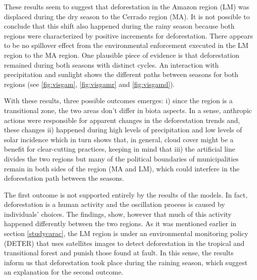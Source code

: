 

These results seem to suggest that deforestation in the Amazon region (LM) was displaced during the dry season to the Cerrado region (MA). It is not possible to conclude that this shift also happened during the rainy season because both regions were characterized by positive increments for deforestation. There appears to be no spillover effect from the environmental enforcement executed in the LM region to the MA region. One plausible piece of evidence is that deforestation remained during both seasons with distinct cycles. An interaction with precipitation and sunlight shows the different paths between seasons for both regions (see \ref{fig:visgam}, \ref{fig:visgamr} and \ref{fig:visgamd}). 

With these results, three possible outcomes emerges: i) since the region is a transitional zone, the two areas don't differ in biota aspects. In a sense, anthropic actions were responsible for apparent changes in the deforestation trends and, these changes ii) happened during high levels of precipitation and low levels of solar incidence which in turn shows that, in general, cloud cover might be a benefit for clear-cutting practices, keeping in mind that iii) the artificial line divides the two regions but many of the political boundaries of municipalities remain in both sides of the region (MA and LM), which could interfere in the deforestation path between the seasons.


The first outcome is not supported entirely by the results of the models. In fact, deforestation is a human activity and the oscillation process is caused by individuals' choices. The findings, show, however that much of this activity happened differently between the two regions. As it was mentioned earlier in section \ref{studycarac}, the LM region is under an environmental monitoring policy (DETER) that uses satellites images to detect deforestation in the tropical and transitional forest and punish those found at fault. In this sense, the results inform us that deforestation took place during the raining season, which suggest an explanation for the second outcome. 

